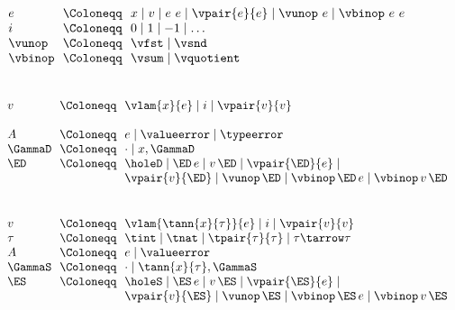 \begin{flushleft}

\begin{minipage}[t]{0.75\columnwidth}
\\
$\begin{array}{l@{~~}c@{~~}l}
  e & \Coloneqq & x \mid v \mid e~e \mid \vpair{e}{e} \mid \vunop~e \mid \vbinop~e~e
\\
  i & \Coloneqq & 0 \mid 1 \mid -1 \mid \ldots
\\
  \vunop & \Coloneqq & \vfst \mid \vsnd
\\
  \vbinop & \Coloneqq & \vsum \mid \vquotient
\end{array}$
\end{minipage}%
\begin{minipage}[t]{0.7\columnwidth}
\\
$\begin{array}{l@{~~}c@{~~}l}
  v & \Coloneqq & \vlam{x}{e} \mid i \mid \vpair{v}{v}
\\ & &
\\
  A & \Coloneqq & e \mid \valueerror \mid \typeerror
\\
  \GammaD & \Coloneqq & \cdot \mid x,\GammaD
\\
  \ED & \Coloneqq & \holeD \mid \ED\,e \mid v\,\ED \mid \vpair{\ED}{e} \mid
\\ & & \vpair{v}{\ED} \mid \vunop\,\ED \mid \vbinop\,\ED\,e \mid \vbinop\,v\,\ED
\end{array}$
\end{minipage}%
\begin{minipage}[t]{0.7\columnwidth}
\\
$\begin{array}{l@{~~}c@{~~}l}
  v & \Coloneqq & \vlam{\tann{x}{\tau}}{e} \mid i \mid \vpair{v}{v}
\\
  \tau & \Coloneqq & \tint \mid \tnat \mid \tpair{\tau}{\tau} \mid \tau \tarrow \tau
\\
  A & \Coloneqq & e \mid \valueerror
\\
  \GammaS & \Coloneqq & \cdot \mid \tann{x}{\tau},\GammaS
\\
  \ES & \Coloneqq & \holeS \mid \ES\,e \mid v\,\ES \mid \vpair{\ES}{e} \mid
\\ & & \vpair{v}{\ES} \mid \vunop\,\ES \mid \vbinop\,\ES\,e \mid \vbinop\,v\,\ES
\end{array}$
\end{minipage}

\bigskip
\begin{minipage}[t]{\columnwidth}
\begin{mathpar}


\end{mathpar}
\end{minipage}
\end{flushleft}
